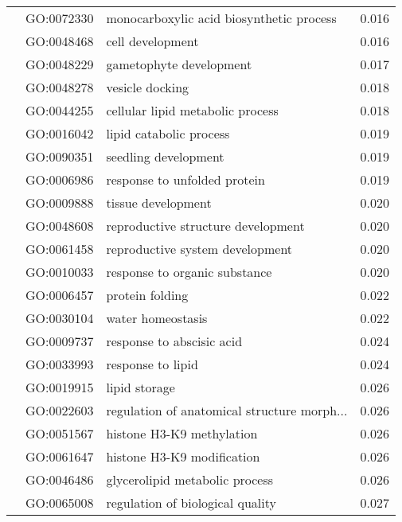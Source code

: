 \begin{longtable}{lllr}
   & GO:0072330 &     monocarboxylic acid biosynthetic process &         0.016 \\
   & GO:0048468 &                             cell development &         0.016 \\
   & GO:0048229 &                      gametophyte development &         0.017 \\
   & GO:0048278 &                              vesicle docking &         0.018 \\
   & GO:0044255 &             cellular lipid metabolic process &         0.018 \\
   & GO:0016042 &                      lipid catabolic process &         0.019 \\
   & GO:0090351 &                         seedling development &         0.019 \\
   & GO:0006986 &                 response to unfolded protein &         0.019 \\
   & GO:0009888 &                           tissue development &         0.020 \\
   & GO:0048608 &           reproductive structure development &         0.020 \\
   & GO:0061458 &              reproductive system development &         0.020 \\
   & GO:0010033 &                response to organic substance &         0.020 \\
   & GO:0006457 &                              protein folding &         0.022 \\
   & GO:0030104 &                            water homeostasis &         0.022 \\
   & GO:0009737 &                    response to abscisic acid &         0.024 \\
   & GO:0033993 &                            response to lipid &         0.024 \\
   & GO:0019915 &                                lipid storage &         0.026 \\
   & GO:0022603 &  regulation of anatomical structure morph... &         0.026 \\
   & GO:0051567 &                    histone H3-K9 methylation &         0.026 \\
   & GO:0061647 &                   histone H3-K9 modification &         0.026 \\
   & GO:0046486 &               glycerolipid metabolic process &         0.026 \\
   & GO:0065008 &             regulation of biological quality &         0.027 \\

\end{longtable}
